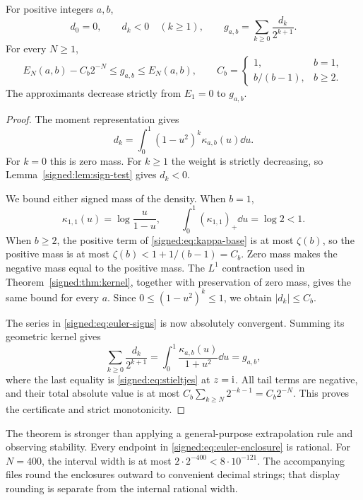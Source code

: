 \begin{theorem}\label{signed:thm:euler-certificate}
For positive integers $a,b$,
\begin{equation}\label{signed:eq:euler-signs}
 d_0=0,\qquad d_k<0\quad(k\ge1),\qquad
 g_{a,b}=\sum_{k\ge0}\frac{d_k}{2^{k+1}}.
\end{equation}
For every $N\ge1$,
\begin{equation}\label{signed:eq:euler-enclosure}
 E_N(a,b)-C_b2^{-N}\le g_{a,b}\le E_N(a,b),\qquad
 C_b=\begin{cases}1,&b=1,\\ b/(b-1),&b\ge2.\end{cases}
\end{equation}
The approximants decrease strictly from $E_1=0$ to $g_{a,b}$.
\end{theorem}
\begin{proof}
The moment representation gives
\begin{equation}\label{signed:eq:d-kernel}
 d_k=\int_0^1(1-u^2)^k\kappa_{a,b}(u)\dd u.
\end{equation}
For $k=0$ this is zero mass. For $k\ge1$ the weight is strictly decreasing, so Lemma~\ref{signed:lem:sign-test} gives $d_k<0$.

We bound either signed mass of the density. When $b=1$,
\[
 \kappa_{1,1}(u)=\log\frac{u}{1-u},\qquad
 \int_0^1(\kappa_{1,1})_+\dd u=\log2<1.
\]
When $b\ge2$, the positive term of \eqref{signed:eq:kappa-base} is at most $\zeta(b)$, so the positive mass is at most $\zeta(b)<1+1/(b-1)=C_b$. Zero mass makes the negative mass equal to the positive mass. The $L^1$ contraction used in Theorem~\ref{signed:thm:kernel}, together with preservation of zero mass, gives the same bound for every $a$. Since $0\le(1-u^2)^k\le1$, we obtain $|d_k|\le C_b$.

The series in \eqref{signed:eq:euler-signs} is now absolutely convergent. Summing its geometric kernel gives
\[
 \sum_{k\ge0}\frac{d_k}{2^{k+1}}
 =\int_0^1\frac{\kappa_{a,b}(u)}{1+u^2}\dd u
 =g_{a,b},
\]
where the last equality is \eqref{signed:eq:stieltjes} at $z=\mathrm{i}$. All tail terms are negative, and their total absolute value is at most $C_b\sum_{k\ge N}2^{-k-1}=C_b2^{-N}$. This proves the certificate and strict monotonicity.
\end{proof}

The theorem is stronger than applying a general-purpose extrapolation rule and observing stability. Every endpoint in \eqref{signed:eq:euler-enclosure} is rational. For $N=400$, the interval width is at most $2\cdot2^{-400}<8\cdot10^{-121}$. The accompanying files round the enclosures outward to convenient decimal strings; that display rounding is separate from the internal rational width.

